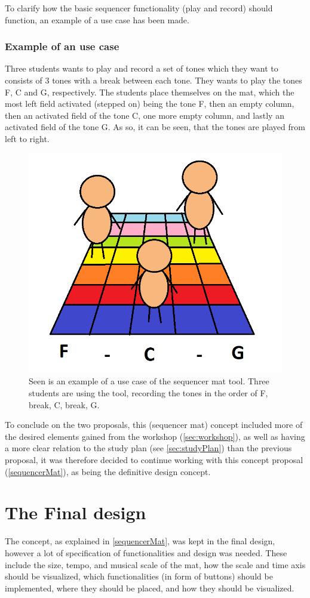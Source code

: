 To clarify how the basic sequencer functionality (play and record) should function, an example of a use case has been made. \\
\subsubsection{Example of an use case}
Three students wants to play and record a set of tones which they want to consists of 3 tones with a break between each tone. They wants to play the tones F, C and G, respectively. The students place themselves on the mat, which the most left field activated (stepped on) being the tone F, then an empty column, then an activated field of the tone C, one more empty column, and lastly an activated field of the tone G. As so, it can be seen, that the tones are played from left to right.   
\begin{figure}[H]
	\centering
	\includegraphics[width=0.7\linewidth]{figure/Design/UseCase} 
	\caption{Seen is an example of a use case of the sequencer mat tool. Three students are using the tool, recording the tones in the order of F, break, C, break, G. }
	\label{fig:UseCase2}
\end{figure}
  

To conclude on the two proposals, this (sequencer mat) concept included more of the desired elements gained from the workshop (\autoref{sec:workshop}), as well as having a more clear relation to the study plan (see \autoref{sec:studyPlan}) than the previous proposal,
it was therefore decided to continue working with this concept proposal (\autoref{sequencerMat}), as being the definitive design concept. 

\section{The Final design}\label{designConcept}
The concept, as explained in \autoref{sequencerMat}, was kept in the final design, however a lot of specification of functionalities and design was needed. These include the size, tempo, and musical scale of the mat, how the scale and time axis should be visualized, which functionalities (in form of buttons) should be implemented, where they should be placed, and how they should be visualized. 


